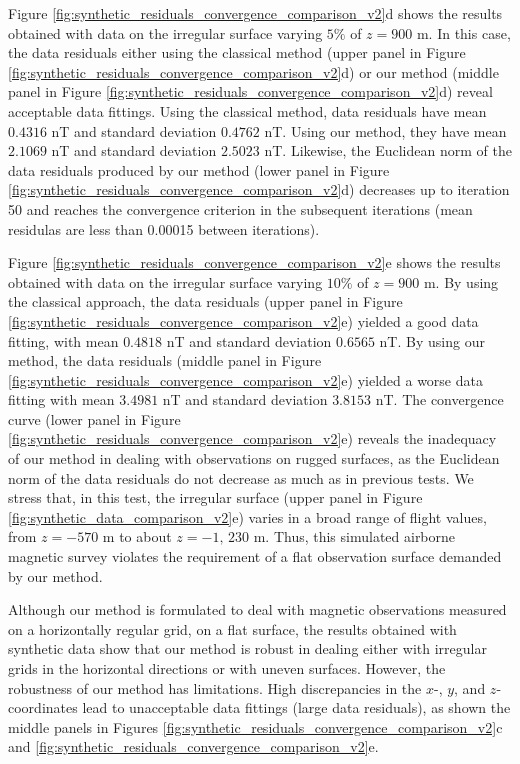 \documentclass[manuscript,noblind]{geophysics}
\begin{document}
Figure \ref{fig:synthetic_residuals_convergence_comparison_v2}d shows the results obtained
with data on the irregular surface varying $5\%$ of $z = 900$ m.
In this case, the data residuals either using the classical method 
(upper panel in Figure \ref{fig:synthetic_residuals_convergence_comparison_v2}d) or
our method (middle panel in Figure \ref{fig:synthetic_residuals_convergence_comparison_v2}d) reveal
acceptable data fittings.
Using the classical method, data residuals have mean $0.4316$ nT and standard deviation $0.4762$ nT.
Using our method, they have mean $2.1069$ nT and standard deviation $2.5023$ nT. 
Likewise, the Euclidean norm of the data residuals produced by our method 
(lower panel in Figure \ref{fig:synthetic_residuals_convergence_comparison_v2}d) decreases up to 
iteration 50 and reaches the convergence criterion in the subsequent iterations (mean residulas are less than 
0.00015 between iterations).

Figure \ref{fig:synthetic_residuals_convergence_comparison_v2}e shows the results obtained
with data on the irregular surface varying $10\%$ of $z = 900$ m.
By using the classical approach, the data residuals (upper panel in 
Figure \ref{fig:synthetic_residuals_convergence_comparison_v2}e) 
yielded a good data fitting, with mean $0.4818$ nT and standard deviation $0.6565$ nT. 
By using our method, the data residuals (middle panel in 
Figure \ref{fig:synthetic_residuals_convergence_comparison_v2}e) yielded a worse data fitting 
with mean $3.4981$ nT and standard deviation $3.8153$ nT.
The convergence curve (lower panel in Figure \ref{fig:synthetic_residuals_convergence_comparison_v2}e)
reveals the inadequacy of our method in dealing with observations on rugged surfaces, as 
the Euclidean norm of the data residuals do not decrease as much as in previous tests. 
We stress that, in this test, the irregular surface (upper panel in Figure 
\ref{fig:synthetic_data_comparison_v2}e) varies in a broad range of flight values, from $z = - 570$ m to about 
$z = -1,\, 230$ m. Thus, this simulated airborne magnetic survey violates the requirement 
of a flat observation surface demanded by our method.

Although our method is formulated to deal with magnetic observations measured on 
a horizontally regular grid, on a flat surface, the results obtained with synthetic 
data show that our method is robust in dealing either with irregular grids in the 
horizontal directions or with uneven surfaces.
However, the robustness of our method has limitations.
High discrepancies in the $x$-, $y$, and $z$-coordinates lead to unacceptable 
data fittings (large data residuals), as shown the middle panels in Figures 
\ref{fig:synthetic_residuals_convergence_comparison_v2}c and
\ref{fig:synthetic_residuals_convergence_comparison_v2}e.
\end{document}
